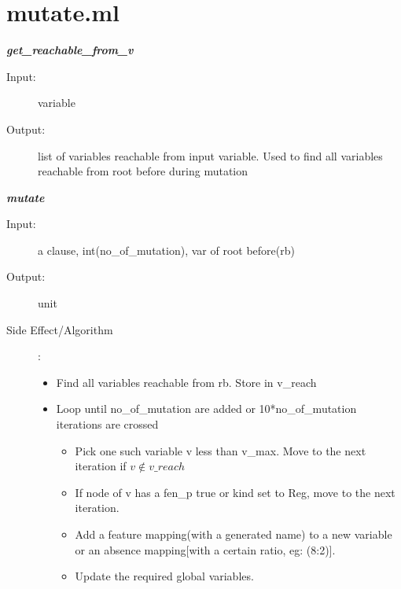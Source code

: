\documentclass[12pt]{article}
\begin{document}
\section{mutate.ml}
\begin{description}

\item \textbf{\textit{get\_reachable\_from\_v}}
\begin{description}
    \item[Input:] variable
    \item[Output:] list of variables reachable from input variable. Used to find all variables reachable from root before during mutation
\end{description}

\item \textbf{\textit{mutate}}
\begin{description}
    \item[Input:] a clause, int(no\_of\_mutation), var of root before(rb)
    \item[Output:] unit
    \item[Side Effect/Algorithm]:
     \begin{itemize}
        \item Find all variables reachable from rb. Store in v\_reach
        \item Loop until no\_of\_mutation are added or 10*no\_of\_mutation iterations are crossed\\
        \begin{itemize}
            \item Pick one such variable v less than v\_max. Move to the next iteration if $v\not\in v\_reach$
            \item If node of v has a fen\_p true or kind set to Reg, move to the next iteration.
            \item Add a feature mapping(with a generated name) to a new variable or an absence mapping[with a certain ratio, eg: (8:2)]. 
            \item Update the required global variables.
        \end{itemize}
    \end{itemize}
\end{description}

\end{description}
\end{document}
